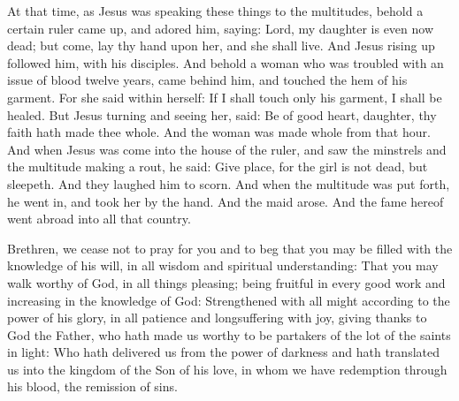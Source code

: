 At that time, as Jesus was speaking these things to the multitudes, behold a certain ruler
came up, and adored him, saying: Lord, my daughter is even now dead; but
come, lay thy hand upon her, and she shall live.
And Jesus rising up followed him, with his disciples.
And behold a woman who was troubled with an issue of blood twelve
years, came behind him, and touched the hem of his garment.
For she said within herself: If I shall touch only his garment, I
shall be healed.
But Jesus turning and seeing her, said: Be of good heart,
daughter, thy faith hath made thee whole. And the woman was made whole
from that hour.
And when Jesus was come into the house of the ruler, and saw the
minstrels and the multitude making a rout,
he said: Give place, for the girl is not dead, but sleepeth. And
they laughed him to scorn.
And when the multitude was put forth, he went in, and took her by
the hand. And the maid arose.
And the fame hereof went abroad into all that country.

\bigskip




Brethren, %
we cease not to pray
for you and to beg that you may be filled with the knowledge of his
will, in all wisdom and spiritual understanding:
That you may walk worthy of God, in all things pleasing; being
fruitful in every good work and increasing in the knowledge of God:
Strengthened with all might according to the power of his glory,
in all patience and longsuffering with joy,
giving thanks to God the Father, who hath made us worthy to be
partakers of the lot of the saints in light:
Who hath delivered us from the power of darkness and hath
translated us into the kingdom of the Son of his love,
in whom we have redemption through his blood, the remission of
sins.



